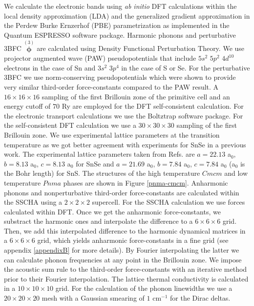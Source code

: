 We calculate the electronic bands using {\it ab initio} DFT calculations within the local density approximation (LDA)\cite{perdew1981self} and the generalized gradient approximation in the Perdew Burke
Ernzerhof (PBE) parametrization\cite{perdew1996generalized} as implemented in the {\sc Quantum ESPRESSO}\cite{giannozzi2009quantum} software package. Harmonic phonons and perturbative 3BFC $\overset{(3)}{\boldsymbol{\phi}}$ 
are calculated  using Density Functional Perturbation Theory\cite{baroni2001phonons,paulatto2013anharmonic}. We use projector augmented wave\cite{blochl1994projector} (PAW) pseudopotentials that 
include $5s^{2}$ $5p^{2}$ $4d^{10}$ electrons in the case of Sn and $3s^{2}$ $3p^{4}$ in the case of S or Se. For the perturbative 3BFC we use norm-conserving pseudopotentials which were 
shown\cite{aseginolaza2019phonon} to provide very similar third-order force-constants compared to the PAW result. A $16\times16\times16$ sampling of the first Brillouin zone of the primitive cell and an energy
cutoff of $70$ Ry are employed for the DFT self-consistent calculation. For the electronic transport calculations we use the Boltztrap software package\cite{madsen2006boltztrap}. For the self-consistent DFT calculation we 
use a $30\times30\times30$ sampling of the first Brillouin zone. We use experimental lattice parameters at the transition temperature as we got better agreement with experiments for SnSe in a previous
work\cite{aseginolaza2019phonon}. The experimental lattice parameters taken from Refs.\cite{adouby1998structure,chattopadhyay1986neutron} are $a=22.13$ a$_{0}$, $b=8.13$ a$_{0}$, $c=8.13$ a$_{0}$ for SnSe
and $a=21.69$ a$_{0}$, $b=7.84$ a$_{0}$, $c=7.84$ a$_{0}$ (a$_{0}$ is the Bohr length) for SnS. The structures of the high temperature $Cmcm$ and low temperature $Pnma$ phases are shown in Figure \ref{pnma-cmcm}.
Anharmonic phonons and nonperturbative third-order force-constants are calculated within the SSCHA using a $2\times2\times2$ supercell. For the SSCHA calculation we use forces calculated within DFT. Once we get the anharmonic
force-constants, we substract the harmonic ones and interpolate the difference to a $6\times6\times6$ grid. Then, we add this interpolated difference to the harmonic dynamical matrices in a $6\times6\times6$ grid, which yields
anharmonic force-constants in a fine grid (see appendix \ref{appendixB} for more details). By Fourier interpolating 
the latter we can calculate phonon frequencies at any point in the Brillouin zone. We impose the acoustic sum rule 
to the third-order force-constants with an iterative method prior to their Fourier 
interpolation\cite{paulatto2013anharmonic,aseginolaza2019phonon}. The lattice thermal conductivity is calculated in 
a $10\times10\times10$ grid. For the calculation of the phonon linewidths we use a $20\times20\times20$ mesh with a 
Gaussian smearing of $1$ cm$^{-1}$ for the Dirac deltas.

